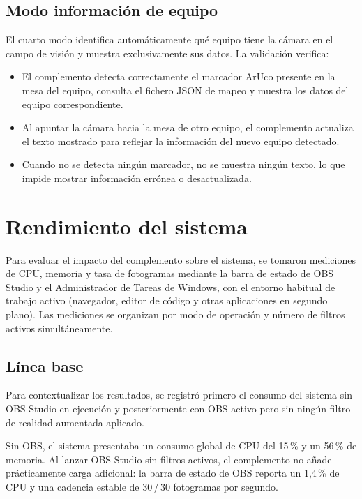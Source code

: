 \subsection{Modo información de equipo}
\label{sec:val_teaminfo}

El cuarto modo identifica automáticamente qué equipo tiene la cámara en el campo de visión y muestra exclusivamente sus datos. La validación verifica:

\begin{itemize}
  \item El complemento detecta correctamente el marcador ArUco presente en la mesa del equipo, consulta el fichero JSON de mapeo y muestra los datos del equipo correspondiente.
  \item Al apuntar la cámara hacia la mesa de otro equipo, el complemento actualiza el texto mostrado para reflejar la información del nuevo equipo detectado.
  \item Cuando no se detecta ningún marcador, no se muestra ningún texto, lo que impide mostrar información errónea o desactualizada.
\end{itemize}

\section{Rendimiento del sistema}
\label{sec:validacion_rendimiento}

Para evaluar el impacto del complemento sobre el sistema, se tomaron mediciones de CPU, memoria y tasa de fotogramas mediante la barra de estado de OBS Studio y el Administrador de Tareas de Windows, con el entorno habitual de trabajo activo (navegador, editor de código y otras aplicaciones en segundo plano). Las mediciones se organizan por modo de operación y número de filtros activos simultáneamente.

\subsection{Línea base}
\label{sec:val_baseline}

Para contextualizar los resultados, se registró primero el consumo del sistema sin OBS Studio en ejecución y posteriormente con OBS activo pero sin ningún filtro de realidad aumentada aplicado.

Sin OBS, el sistema presentaba un consumo global de CPU del 15\,\% y un 56\,\% de memoria. Al lanzar OBS Studio sin filtros activos, el complemento no añade prácticamente carga adicional: la barra de estado de OBS reporta un 1,4\,\% de CPU y una cadencia estable de 30\,/\,30 fotogramas por segundo.

